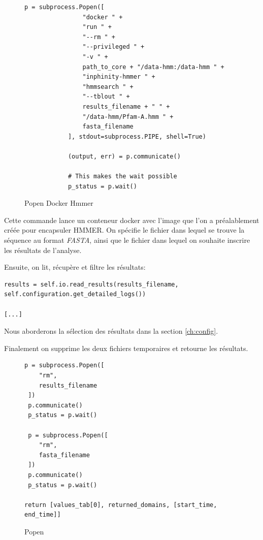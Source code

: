 \begin{figure}[H] 
\centering 
\begin{lstlisting}[frame=single]
p = subprocess.Popen([
                "docker " +
                "run " +
                "--rm " +
                "--privileged " +
                "-v " +
                path_to_core + "/data-hmm:/data-hmm " +
                "inphinity-hmmer " +
                "hmmsearch " +
                "--tblout " +
                results_filename + " " +
                "/data-hmm/Pfam-A.hmm " +
                fasta_filename
            ], stdout=subprocess.PIPE, shell=True)

            (output, err) = p.communicate()

            # This makes the wait possible
            p_status = p.wait()
\end{lstlisting} 
\caption[Popen Docker Hmmer]{Popen Docker Hmmer}
\label{fig:popenHmmer} 
\end{figure}

Cette commande lance un conteneur docker avec l'image que l'on a préalablement créée pour encapsuler HMMER. On spécifie le fichier dans lequel se trouve la séquence au format \emph{FASTA}, ainsi que le fichier dans lequel on souhaite inscrire les résultats de l'analyse.

Ensuite, on lit, récupère et filtre les résultats:

\begin{lstlisting}[frame=single]
results = self.io.read_results(results_filename, self.configuration.get_detailed_logs())

[...]
\end{lstlisting}

Nous aborderons la sélection des résultats dans la section \ref{ch:config}.

Finalement on supprime les deux fichiers temporaires et  retourne les résultats.

\begin{figure}[H] 
\centering 
\begin{lstlisting}[frame=single]
p = subprocess.Popen([
	"rm",
	results_filename
 ])
 p.communicate()
 p_status = p.wait()

 p = subprocess.Popen([
 	"rm",
 	fasta_filename
 ])
 p.communicate()
 p_status = p.wait()

return [values_tab[0], returned_domains, [start_time, end_time]]
\end{lstlisting}
\caption[Popen remove]{Popen}
\label{fig:popen} 
\end{figure}

